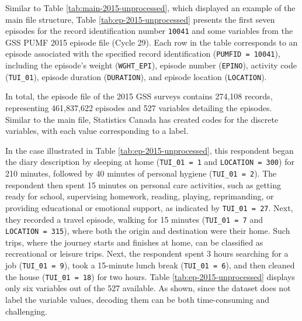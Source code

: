 \documentclass[Royal,times,sageh]{sagej}
\begin{document}
Similar to Table \ref{tab:main-2015-unprocessed}, which displayed an
example of the main file structure, Table \ref{tab:ep-2015-unprocessed}
presents the first seven episodes for the record identification number
\texttt{10041} and some variables from the GSS PUMF 2015 episode file
(Cycle 29). Each row in the table corresponds to an episode associated
with the specified record identification (\texttt{PUMFID\ =\ 10041}),
including the episode's weight (\texttt{WGHT\_EPI}), episode number
(\texttt{EPINO}), activity code (\texttt{TUI\_01}), episode duration
(\texttt{DURATION}), and episode location (\texttt{LOCATION}).

In total, the episode file of the 2015 GSS surveys contains 274,108
records, representing 461,837,622 episodes and 527 variables detailing
the episodes. Similar to the main file, Statistics Canada has created
codes for the discrete variables, with each value corresponding to a
label.

In the case illustrated in Table \ref{tab:ep-2015-unprocessed}, this
respondent began the diary description by sleeping at home
(\texttt{TUI\_01\ =\ 1} and \texttt{LOCATION\ =\ 300}) for 210 minutes,
followed by 40 minutes of personal hygiene (\texttt{TUI\_01\ =\ 2}). The
respondent then spent 15 minutes on personal care activities, such as
getting ready for school, supervising homework, reading, playing,
reprimanding, or providing educational or emotional support, as
indicated by \texttt{TUI\_01\ =\ 27}. Next, they recorded a travel
episode, walking for 15 minutes (\texttt{TUI\_01\ =\ 7} and
\texttt{LOCATION\ =\ 315}), where both the origin and destination were
their home. Such trips, where the journey starts and finishes at home,
can be classified as recreational or leisure trips. Next, the respondent
spent 3 hours searching for a job (\texttt{TUI\_01\ =\ 9}), took a
15-minute lunch break (\texttt{TUI\_01\ =\ 6}), and then cleaned the
house (\texttt{TUI\_01\ =\ 18}) for two hours. Table
\ref{tab:ep-2015-unprocessed} displays only six variables out of the 527
available. As shown, since the dataset does not label the variable
values, decoding them can be both time-consuming and challenging.

\begingroup\fontsize{8}{10}\selectfont
\end{document}
